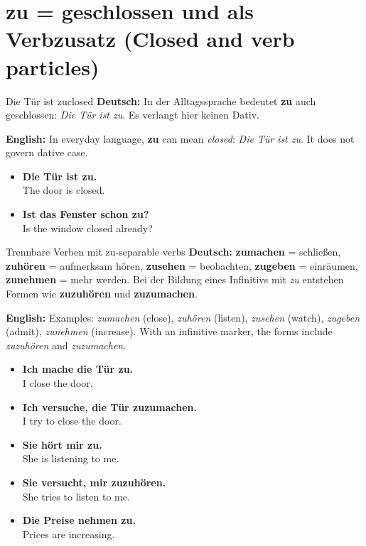 \documentclass[a4paper,11pt]{article}
\newcommand{\GermanText}[1]{\textbf{Deutsch: }#1\par}
\newcommand{\EnglishText}[1]{{\small\color{SoftGray}\textbf{English: }#1\par}}
\newcommand{\ExampleItem}[2]{\item \textbf{#1}\\{\small\color{SoftGray}#2}}
\begin{document}
\section{zu = geschlossen und als Verbzusatz (Closed and verb particles)}
\begin{grammarentry}{Die Tür ist zu}{closed}
\GermanText{In der Alltagssprache bedeutet \textbf{zu} auch \glqq geschlossen\grqq{}: \emph{Die Tür ist zu}. Es verlangt hier keinen Dativ.}
\EnglishText{In everyday language, \textbf{zu} can mean \emph{closed}: \emph{Die Tür ist zu}. It does not govern dative case.}
\end{grammarentry}
\begin{exbox}
\begin{itemize}
\ExampleItem{Die Tür ist zu.}{The door is closed.}
\ExampleItem{Ist das Fenster schon zu?}{Is the window closed already?}
\end{itemize}
\end{exbox}
\begin{grammarentry}{Trennbare Verben mit zu-}{separable verbs}
\GermanText{\textbf{zumachen} = schließen, \textbf{zuhören} = aufmerksam hören, \textbf{zusehen} = beobachten, \textbf{zugeben} = einräumen, \textbf{zunehmen} = mehr werden. Bei der Bildung eines Infinitivs mit \emph{zu} entstehen Formen wie \textbf{zuzuhören} und \textbf{zuzumachen}.}
\EnglishText{Examples: \emph{zumachen} (close), \emph{zuhören} (listen), \emph{zusehen} (watch), \emph{zugeben} (admit), \emph{zunehmen} (increase). With an infinitive marker, the forms include \emph{zuzuhören} and \emph{zuzumachen}.}
\end{grammarentry}
\begin{exbox}
\begin{itemize}
\ExampleItem{Ich mache die Tür zu.}{I close the door.}
\ExampleItem{Ich versuche, die Tür zuzumachen.}{I try to close the door.}
\ExampleItem{Sie hört mir zu.}{She is listening to me.}
\ExampleItem{Sie versucht, mir zuzuhören.}{She tries to listen to me.}
\ExampleItem{Die Preise nehmen zu.}{Prices are increasing.}
\end{itemize}
\end{exbox}
\end{document}
